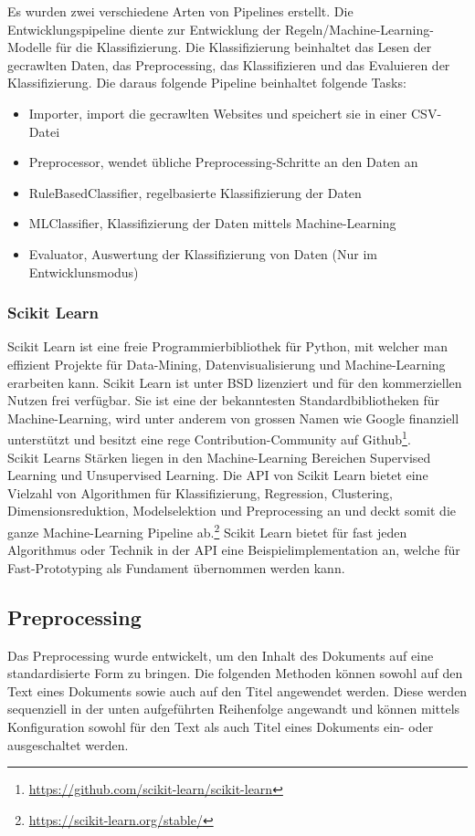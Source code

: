 Es wurden zwei verschiedene Arten von Pipelines erstellt.
Die Entwicklungspipeline diente zur Entwicklung der Regeln/Machine-Learning-Modelle für die Klassifizierung.
Die Klassifizierung beinhaltet das Lesen der gecrawlten Daten, das Preprocessing, das Klassifizieren und das Evaluieren der Klassifizierung.
Die daraus folgende Pipeline beinhaltet folgende Tasks:
\begin{itemize}
	\item Importer, import die gecrawlten Websites und speichert sie in einer CSV-Datei
	\item Preprocessor, wendet übliche Preprocessing-Schritte an den Daten an
	\item RuleBasedClassifier, regelbasierte Klassifizierung der Daten 
	\item MLClassifier, Klassifizierung der Daten mittels Machine-Learning
	\item Evaluator, Auswertung der Klassifizierung von Daten (Nur im Entwicklunsmodus)
\end{itemize}
\subsubsection{Scikit Learn}
Scikit Learn ist eine freie Programmierbibliothek für Python, mit welcher man effizient Projekte für Data-Mining, Datenvisualisierung und Machine-Learning erarbeiten kann.
Scikit Learn ist unter BSD lizenziert und für den kommerziellen Nutzen frei verfügbar.
Sie ist eine der bekanntesten Standardbibliotheken für Machine-Learning, wird unter anderem von grossen Namen wie Google finanziell unterstützt und besitzt eine rege Contribution-Community auf Github\footnote{\url{https://github.com/scikit-learn/scikit-learn}}.\\
Scikit Learns Stärken liegen in den Machine-Learning Bereichen \glqq Supervised Learning\grqq{} und \glqq Unsupervised Learning\grqq{}.
Die API von Scikit Learn bietet eine Vielzahl von Algorithmen für Klassifizierung, Regression, Clustering, Dimensionsreduktion, Modelselektion und Preprocessing an und deckt somit die ganze Machine-Learning Pipeline ab.\footnote{\url{https://scikit-learn.org/stable/}}
Scikit Learn bietet für fast jeden Algorithmus oder Technik in der API eine Beispielimplementation an, welche für Fast-Prototyping  als Fundament übernommen werden kann.
\subsection{Preprocessing}\label{preprocessing}
Das Preprocessing wurde entwickelt, um den Inhalt des Dokuments auf eine standardisierte Form zu bringen.
Die folgenden Methoden können sowohl auf den Text eines Dokuments sowie auch auf den Titel angewendet werden.
Diese werden sequenziell in der unten aufgeführten Reihenfolge angewandt und können mittels Konfiguration sowohl für den Text als auch Titel eines Dokuments ein- oder ausgeschaltet werden.
